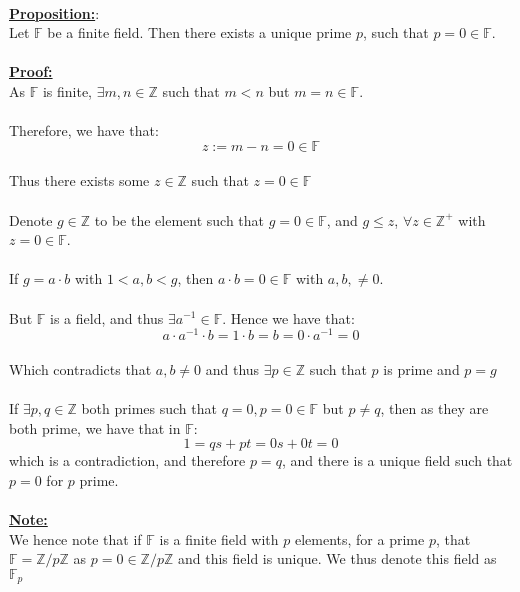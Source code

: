 \documentclass[11pt]{article}
\theoremstyle{plain}
\theoremstyle{definition}
\begin{document}
\\
\textbf{\underline{Proposition:}}:\\
Let $\mathbb{F}$ be a finite field. Then there exists a unique prime $p$, such that $p = 0 \in \mathbb{F}$. \\
\\
\textbf{\underline{Proof:}}\\
As $\mathbb{F}$ is finite, $\exists m,n \in \mathbb{Z} $ such that $m < n$ but $m=n \in \mathbb{F}$. \\
\\
Therefore, we have that:
\begin{equation*}
z:= m-n=0 \in \mathbb{F}
\end{equation*}  
\\
Thus there exists some $z \in \mathbb{Z}$ such that $z=0 \in \mathbb{F}$ \\
\\
Denote $g \in \mathbb{Z}$ to be the element such that $g=0 \in \mathbb{F}$, and $g \leq z$,  $\forall z \in \mathbb{Z}^+$ with $z=0 \in \mathbb{F}$.\\
\\
If $g=a \cdot b$ with $1< a,b<g$, then $a \cdot b = 0 \in \mathbb{F}$ with $a,b, \neq 0$.\\
\\
But $\mathbb{F}$ is a field, and thus $\exists a^{-1} \in \mathbb{F}$. Hence we have that:\\
\begin{equation*}
a\cdot a^{-1} \cdot b = 1 \cdot b = b = 0 \cdot a^{-1}  = 0
\end{equation*} 
\\
Which contradicts that $a,b \neq 0$ and thus $\exists p \in \mathbb{Z}$ such that $p$ is prime and $p=g$ \\
\\
If $\exists p,q \in \mathbb{Z}$ both primes such that $q=0, p=0 \in \mathbb{F}$ but $p \neq q$, then as they are both prime, we have that in $\mathbb{F}$:\\
\begin{equation*}
1=qs + pt = 0s+0t = 0
\end{equation*} 
which is a contradiction, and therefore $p=q$, and there is a unique field such that $p=0$ for $p$ prime.\\
\\
\textbf{\underline{Note:}}\\
We hence note that if $\mathbb{F}$ is a finite field with $p$ elements, for a prime $p$, that $\mathbb{F} = \mathbb{Z}/p\mathbb{Z}$ as $p=0 \in \mathbb{Z}/p\mathbb{Z}$ and this field is unique. We thus denote this field as $\mathbb{F}_p$\\
\end{document}
